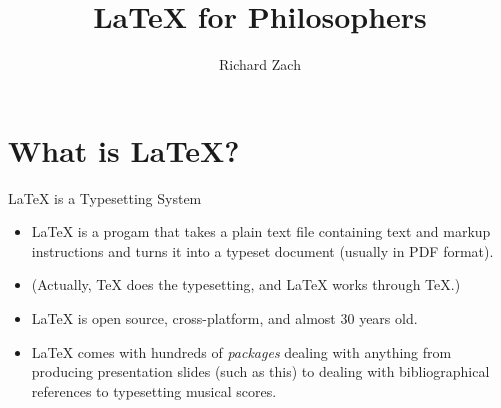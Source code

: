 
\usepackage{hyperref}
\usepackage{graphicx}
  \beamersetuncovermixins
  {}%
  {}

\newenvironment{articleonly}{\mode<article>}{\mode<all>}


\title{\LaTeX{} for Philosophers}

\author{Richard Zach}



\frame{\maketitle}


\section{What is \LaTeX?}

\begin{frame}{\LaTeX{} is a Typesetting System}

\begin{itemize}
\item \LaTeX{} is a progam that takes a plain text file containing
  text and markup instructions and turns it into a typeset document
  (usually in PDF format).
\item (Actually, \TeX{} does the typesetting, and \LaTeX{} works through \TeX.)
\item \LaTeX{} is open source, cross-platform, and almost 30 years old.
\item \LaTeX{} comes with hundreds of \emph{packages} dealing with
  anything from producing presentation slides (such as this) to
  dealing with bibliographical references to typesetting musical
  scores.
\end{itemize}
\end{frame}

